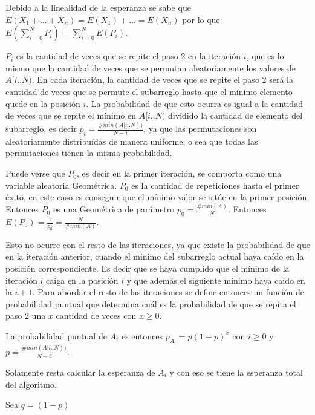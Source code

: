 Debido a la linealidad de la esperanza se sabe que
$E(X_1 + ... + X_n) = E(X_1) + ... = E(X_n)$ por lo que
$E(\sum_{i = 0}^{N}{P_i}) = \sum_{i = 0}^{N}{E(P_i)}$.

$P_i$ es la cantidad de veces que se repite el paso 2 en la iteración $i$, que
es lo mismo que la cantidad de veces que se permutan aleatoriamente los
valores de $A[i..N)$. En cada iteración, la cantidad de veces que se repite el
paso 2 será la cantidad de veces que se permute el subarreglo hasta que el
mínimo elemento quede en la posición $i$. La probabilidad de que esto ocurra
es igual a la cantidad de veces que se repite el mínimo en $A[i..N)$ dividido
la cantidad de elemento del subarreglo, es decir
$p_i = \frac{\#min(A[i..N))}{N - i}$, ya que las permutaciones son
aleatoriamente distribuídas de manera uniforme; o sea que todas las
permutaciones tienen la misma probabilidad.

Puede verse que $P_0$, es decir en la primer iteración, se comporta como una
variable aleatoria Geométrica. $P_0$ es la cantidad de repeticiones hasta el
primer éxito, en este caso es conseguir que el mínimo valor se sitúe en la
primer posición. Entonces $P_0$ es una Geométrica de parámetro
$p_0 = \frac{\#min(A)}{N}$. Entonces
$E(P_0) = \frac{1}{p_0} = \frac{N}{\#min(A)}$.

Esto no ocurre con el resto de las iteraciones, ya que existe la probabilidad
de que en la iteración anterior, cuando el minimo del subarreglo actual haya
caído en la posición correspondiente. Es decir que se haya cumplido que el
mínimo de la iteración $i$ caiga en la posición $i$ y que además el siguiente
mínimo haya caído en la $i + 1$. Para abordar el resto de las iteraciones se
define entonces un función de probabilidad puntual que determina cuál es la
probabilidad de que se repita el paso 2 una $x$ cantidad de veces con
$x \geq 0$.

La probabilidad puntual de $A_i$ es entonces $p_{A_i} = p (1 - p)^x$ con
$i \geq 0$ y $p = \frac{\#min(A[i..N))}{N - i}$.

Solamente resta calcular la esperanza de $A_i$ y con eso se tiene la esperanza
total del algoritmo.

Sea $q = (1 - p)$

